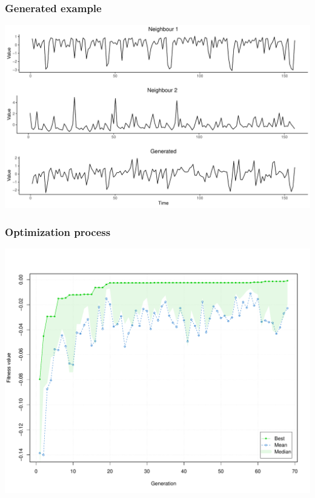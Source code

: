 \begin{frame}
\frametitle{Generated example}

\begin{center}
\includegraphics[width = 0.8\linewidth]{slides/gen_and_neighbours.pdf}
\end{center}
\end{frame}

\begin{frame}
\frametitle{Optimization process}

\begin{center}
\includegraphics[width = 0.8\linewidth]{slides/optim.pdf}
\end{center}
\end{frame}

